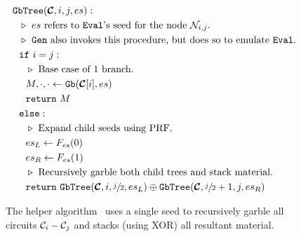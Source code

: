 
\begin{figure}
  \begin{align*}
    &\gbtree(\vec{\cir}, i, j, es):\\
    &~~\codecomment{$es$ refers to \E's seed for the node $\node_{i,j}$.}\\
    &~~\codecomment{\G also invokes this procedure, but does so to emulate \E.}\\
    &~~\cif~i = j:\\
    &~~~~\codecomment{Base case of $1$ branch.}\\
    &~~~~M, \cdot, \cdot \gets \gb(\vec\cir[i], es)\\
    &~~~~\creturn~M\\
    &~~\celse:\\
    &~~~~\codecomment{Expand child seeds using PRF.}\\
    &~~~~es_L \gets F_{es}(0)\\
    &~~~~es_R \gets F_{es}(1)\\
    &~~~~\codecomment{Recursively garble both child trees and stack
    material.}\\
    &~~~~\creturn~\gbtree(\vec{\cir}, i, \sfrac{j}{2}, es_L) \oplus
    \gbtree(\vec{\cir}, \sfrac{j}{2} + 1, j, es_R)\\
  \end{align*}
  \caption{%
    The helper algorithm \gbtree\ uses a single seed to recursively
    garble all circuits $\mathcal C_i - \mathcal C_j$ and stacks (using XOR) all
    resultant material.
  }
\end{figure}

